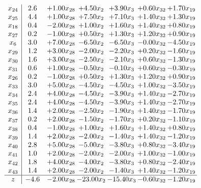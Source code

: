 \documentclass[8pt]{article}
\begin{document}
\[\begin{array}{c| c c@{\hskip 2pt} c@{\hskip 2pt} c@{\hskip 2pt} c@{\hskip 2pt} c@{\hskip 2pt} }
 x_{24}   &  2.6 & +  1.00 x_{28} & +  4.50 x_{2} & +  3.90 x_{3} & +  0.60 x_{32} & +  1.70 x_{19}\\
 x_{25}   &  4.4 & +  1.00 x_{28} & +  7.50 x_{2} & +  7.10 x_{3} & +  1.40 x_{32} & +  1.30 x_{19}\\
 x_{18}   &  0.4 & -2.00 x_{28} & +  1.00 x_{2} & +  1.60 x_{3} & +  1.40 x_{32} & +  0.80 x_{19}\\
 x_{27}   &  0.2 & -1.00 x_{28} & +  0.50 x_{2} & +  1.30 x_{3} & +  1.20 x_{32} & +  0.90 x_{19}\\
 x_{6}   &  3.0 & +  7.00 x_{28} & -6.50 x_{2} & -6.50 x_{3} & -0.00 x_{32} & -4.50 x_{19}\\
 x_{29}   &  1.2 & +  3.00 x_{28} & -2.00 x_{2} & -2.20 x_{3} & +  0.20 x_{32} & -1.60 x_{19}\\
 x_{30}   &  1.6 & +  3.00 x_{28} & -2.50 x_{2} & -2.10 x_{3} & +  0.60 x_{32} & -1.30 x_{19}\\
 x_{31}   &  0.6 & +  1.00 x_{28} & -0.50 x_{2} & -0.10 x_{3} & +  0.60 x_{32} & -0.30 x_{19}\\
 x_{26}   &  0.2 & -1.00 x_{28} & +  0.50 x_{2} & +  1.30 x_{3} & +  1.20 x_{32} & +  0.90 x_{19}\\
 x_{33}   &  3.0 & +  5.00 x_{28} & -4.50 x_{2} & -4.50 x_{3} & +  1.00 x_{32} & -3.50 x_{19}\\
 x_{34}   &  2.4 & +  4.00 x_{28} & -4.50 x_{2} & -3.90 x_{3} & +  1.40 x_{32} & -2.70 x_{19}\\
 x_{35}   &  2.4 & +  4.00 x_{28} & -4.50 x_{2} & -3.90 x_{3} & +  1.40 x_{32} & -2.70 x_{19}\\
 x_{36}   &  1.4 & +  2.00 x_{28} & -2.50 x_{2} & -1.90 x_{3} & +  1.40 x_{32} & -1.70 x_{19}\\
 x_{37}   &  0.2 & +  2.00 x_{28} & -1.50 x_{2} & -1.70 x_{3} & +  0.20 x_{32} & -1.10 x_{19}\\
 x_{38}   &  0.4 & -1.00 x_{28} & +  1.00 x_{2} & +  1.60 x_{3} & +  1.40 x_{32} & +  0.80 x_{19}\\
 x_{39}   &  1.4 & +  2.00 x_{28} & -2.00 x_{2} & -1.40 x_{3} & +  1.40 x_{32} & -1.20 x_{19}\\
 x_{40}   &  2.8 & +  5.00 x_{28} & -5.00 x_{2} & -3.80 x_{3} & +  0.80 x_{32} & -3.40 x_{19}\\
 x_{41}   &  1.0 & +  2.00 x_{28} & -2.00 x_{2} & -2.00 x_{3} & +  1.00 x_{32} & -1.00 x_{19}\\
 x_{42}   &  1.8 & +  4.00 x_{28} & -4.00 x_{2} & -3.80 x_{3} & +  0.80 x_{32} & -2.40 x_{19}\\
 x_{43}   &  1.4 & +  2.00 x_{28} & -2.00 x_{2} & -1.40 x_{3} & +  1.40 x_{32} & -1.20 x_{19}\\
\hline
z    &  -4.6 & -2.00 x_{28} & -23.00 x_{2} & -15.40 x_{3} & -0.60 x_{32} & -1.20 x_{19}\\
\end{array}\]
\end{document}
